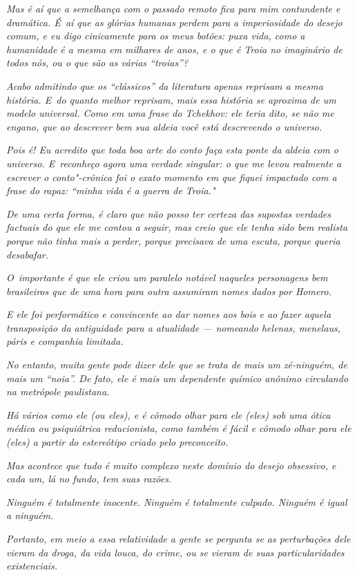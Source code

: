 \emph{Mas é aí que a semelhança com o passado remoto fica para mim
contundente e dramática. É~aí que as glórias humanas perdem para a
imperiosidade do desejo comum, e eu digo cinicamente para os meus
botões: puxa vida, como a humanidade é a mesma em milhares de anos, e o
que é Troia no imaginário de todos nós, ou o que são as várias
``troias''?}

\emph{Acabo admitindo que os ``clássicos'' da literatura apenas reprisam
a mesma história. E~do quanto melhor reprisam, mais essa história se
aproxima de um modelo universal. Como em uma frase do Tchekhov: ele teria
dito, se não me engano, que ao descrever bem sua aldeia você está
descrevendo o universo.}

\emph{Pois é! Eu acredito que toda boa arte do conto faça esta ponte da
aldeia com o universo. E~reconheço agora uma verdade singular: o que me
levou realmente a escrever o conto"-crônica foi o exato momento em que
fiquei impactado com a frase do rapaz: ``minha vida é a guerra de
Troia."}

\emph{De uma certa forma, é claro que não posso ter certeza das supostas
verdades factuais do que ele me contou a seguir, mas creio que ele tenha
sido bem realista porque não tinha mais a perder, porque precisava de
uma escuta, porque queria desabafar.}

\emph{O~importante é que ele criou um paralelo notável naqueles
personagens bem brasileiros que de uma hora para outra assumiram nomes
dados por Homero.}

\emph{E ele foi performático e convincente ao dar nomes aos bois e ao
fazer aquela transposição da antiguidade para a atualidade --- nomeando
helenas, menelaus, páris e companhia limitada.}

\emph{No entanto, muita gente pode dizer dele que se trata de mais um zé-ninguém, 
de mais um ``noia''. De fato, ele é mais um dependente químico
anônimo circulando na metrópole paulistana.}

\emph{Há vários como ele (ou eles), e é cômodo olhar para ele (eles) sob
uma ótica médica ou psiquiátrica reducionista, como também é fácil e
cômodo olhar para ele (eles) a partir do estereótipo criado pelo
preconceito.}

\emph{Mas acontece que tudo é muito complexo neste domínio do desejo
obsessivo, e cada um, lá no fundo, tem suas razões.}

\emph{Ninguém é totalmente inocente. Ninguém é totalmente culpado.
Ninguém é igual a ninguém.}

\emph{Portanto, em meio a essa relatividade a gente se pergunta se as
perturbações dele vieram da droga, da vida louca, do crime, ou se vieram
de suas particularidades existenciais.}

